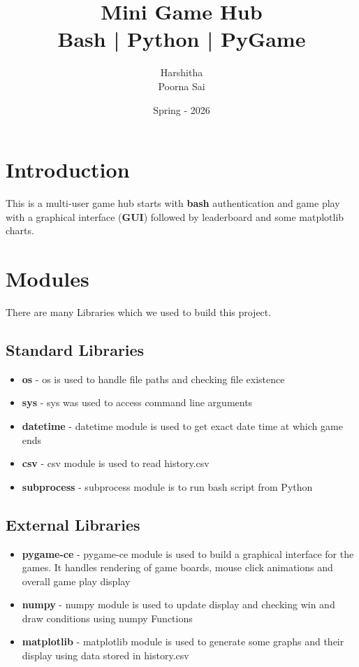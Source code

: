 \documentclass[12pt, letterpaper]{article}
\title{Mini Game Hub \\ Bash | Python | PyGame }
\author{Harshitha \\ Poorna Sai}
\date{Spring - 2026}
\begin{document}
\maketitle
\tableofcontents
\newpage

\section{Introduction}
This is a multi-user game hub starts with \textbf{bash} authentication and game play with a graphical interface (\textbf{GUI}) followed by leaderboard and some matplotlib charts.

\section{Modules}
There are many Libraries which we used to build this project.

\subsection{Standard Libraries}
\begin{itemize}
    \item \textbf{os} - os is used to handle file paths and checking file existence
    \item \textbf{sys} - sys was used to access command line arguments
    \item \textbf{datetime} - datetime module is used to get exact date time at which game ends
    \item \textbf{csv} - csv module is used to read history.csv
    \item \textbf{subprocess} - subprocess module is to run bash script from Python
\end{itemize}

\subsection{External Libraries}
\begin{itemize}
    \item \textbf{pygame-ce} - pygame-ce module is used to build a graphical interface for the games. It handles rendering of game boards, mouse click animations and overall game play display
    \item \textbf{numpy} - numpy module is used to update display and checking win and draw conditions using numpy Functions
    \item \textbf{matplotlib} - matplotlib module is used to generate some graphs and their display using data stored in history.csv 
\end{itemize}
\end{document}
